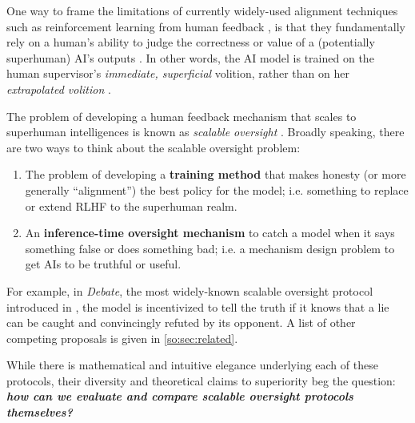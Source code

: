 One way to frame the limitations of currently widely-used alignment techniques such as reinforcement learning from human feedback \citep{christianoDeepReinforcementLearning2017}, is that they fundamentally rely on a human's ability to judge the correctness or value of a (potentially superhuman) AI's outputs \citep{burnsWeaktoStrongGeneralizationEliciting2024}. In other words, the AI model is trained on the human supervisor's \emph{immediate, superficial} volition, rather than on her \emph{extrapolated volition} \citep{yudkowskyCoherentExtrapolatedVolition2004}.

The problem of developing a human feedback mechanism that scales to superhuman intelligences is known as \emph{scalable oversight} \citep{bowmanMeasuringProgressScalable2022}. Broadly speaking, there are two ways to think about the scalable oversight problem:

\begin{enumerate}

	\item   The problem of developing a \textbf{training method} that makes   honesty (or more generally ``alignment'') the best policy for the model;   i.e. something to replace or extend RLHF to the superhuman realm.

	\item   An \textbf{inference-time oversight mechanism} to catch a model when it says something false or does something bad; i.e. a mechanism design problem to get AIs to be truthful or useful.

\end{enumerate}

For example, in \emph{Debate}, the most widely-known scalable oversight protocol introduced in \citet{irvingAISafetyDebate2018}, the model is incentivized to tell the truth if it knows that a lie can be caught and convincingly refuted by its opponent. A list of other competing proposals is given in \cref{so:sec:related}.

While there is mathematical and intuitive elegance underlying each of these protocols, their diversity and theoretical claims to superiority beg the question: \textbf{\emph{how can we evaluate and compare scalable oversight protocols themselves?}}



